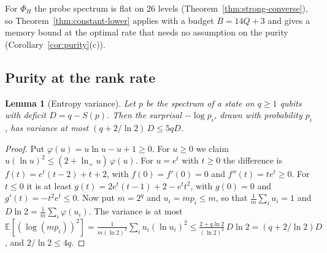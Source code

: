 \documentclass[11pt,a4paper]{article}
\theoremstyle{plain}
\newtheorem{lemma}[theorem]{Lemma}
\theoremstyle{definition}
\theoremstyle{remark}
\begin{document}
For $\Phi_H$ the probe spectrum is flat on $26$ levels (Theorem~\ref{thm:strong-converse}), so Theorem~\ref{thm:constant-lower} applies with a budget
$B=14Q+3$ and gives a memory bound at the optimal rate that needs no assumption on the purity (Corollary~\ref{cor:purity}(c)).


\subsection{Purity at the rank rate}

\begin{lemma}[Entropy variance]\label{lem:entropy-variance}
Let $p$ be the spectrum of a state on $q\ge1$ qubits with deficit $D=q-S(p)$. Then the surprisal $-\log p_i$, drawn with probability $p_i$, has variance at
most $(q+2/\ln2)\,D\le5qD$.
\end{lemma}

\begin{proof}
Put $\varphi(u)=u\ln u-u+1\ge0$. For $u\ge0$ we claim $u(\ln u)^2\le(2+\ln_+u)\,\varphi(u)$. For $u=e^t$ with $t\ge0$ the difference is
$f(t)=e^t(t-2)+t+2$, with $f(0)=f'(0)=0$ and $f''(t)=te^t\ge0$. For $t\le0$ it is at least $g(t)=2e^t(t-1)+2-e^tt^2$, with $g(0)=0$ and
$g'(t)=-t^2e^t\le0$. Now put $m=2^q$ and $u_i=mp_i\le m$, so that $\frac1m\sum_iu_i=1$ and $D\ln2=\frac1m\sum_i\varphi(u_i)$. The variance is at most
$\mathbb E[(\log(mp_i))^2]=\frac1{m(\ln2)^2}\sum_iu_i(\ln u_i)^2\le\frac{2+q\ln2}{(\ln2)^2}\,D\ln2=(q+2/\ln2)D$, and $2/\ln2\le4q$.
\end{proof}
\end{document}
